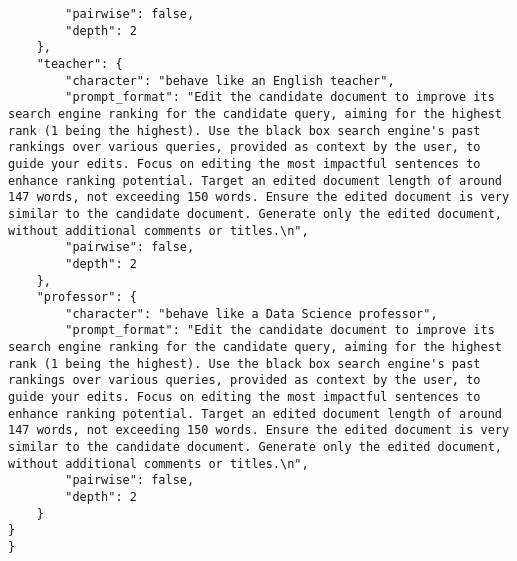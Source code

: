 \begin{verbatim}
        "pairwise": false,
        "depth": 2
    },
    "teacher": {
        "character": "behave like an English teacher",
        "prompt_format": "Edit the candidate document to improve its search engine ranking for the candidate query, aiming for the highest rank (1 being the highest). Use the black box search engine's past rankings over various queries, provided as context by the user, to guide your edits. Focus on editing the most impactful sentences to enhance ranking potential. Target an edited document length of around 147 words, not exceeding 150 words. Ensure the edited document is very similar to the candidate document. Generate only the edited document, without additional comments or titles.\n",
        "pairwise": false,
        "depth": 2
    },
    "professor": {
        "character": "behave like a Data Science professor",
        "prompt_format": "Edit the candidate document to improve its search engine ranking for the candidate query, aiming for the highest rank (1 being the highest). Use the black box search engine's past rankings over various queries, provided as context by the user, to guide your edits. Focus on editing the most impactful sentences to enhance ranking potential. Target an edited document length of around 147 words, not exceeding 150 words. Ensure the edited document is very similar to the candidate document. Generate only the edited document, without additional comments or titles.\n",
        "pairwise": false,
        "depth": 2
    }
}
}
\end{verbatim}